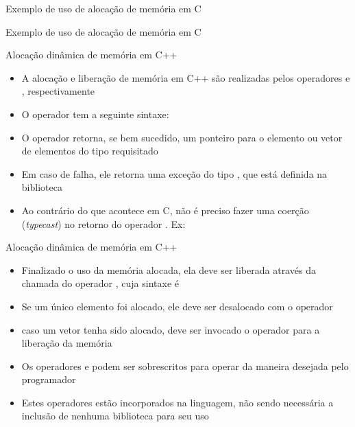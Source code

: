 \begin{frame}[fragile]{Exemplo de uso de alocação de memória em C}
\end{frame}

\begin{frame}[fragile]{Exemplo de uso de alocação de memória em C}
\end{frame}

\begin{frame}[fragile]{Alocação dinâmica de memória em C++}

	\begin{itemize}
		\item A alocação e liberação de memória em C++ são realizadas pelos operadores 
         e , respectivamente

		\item O operador  tem a seguinte sintaxe:

		\item O operador  retorna, se bem sucedido, um ponteiro para o 
        elemento ou vetor de elementos do tipo requisitado

        \item Em caso de falha, ele retorna uma exceção do tipo , que
            está definida na biblioteca 

		\item Ao contrário do que acontece em C, não é preciso fazer uma coerção 
        (\textit{typecast}) no retorno do operador . Ex:

	\end{itemize}

\end{frame}

\begin{frame}[fragile]{Alocação dinâmica de memória em C++}

	\begin{itemize}
		\item Finalizado o uso da memória alocada, ela deve ser liberada através da chamada do 
        operador , cuja sintaxe é 

		\item Se um único elemento foi alocado, ele deve ser desalocado com o operador 

        \item caso um vetor tenha sido alocado, deve ser invocado o operador 
		 para a liberação da memória

		\item Os operadores  e  podem ser 
        sobrescritos para operar da maneira desejada pelo programador

		\item Estes operadores estão incorporados na linguagem, não sendo necessária a inclusão de 
		nenhuma biblioteca para seu uso
	\end{itemize}
\end{frame}

